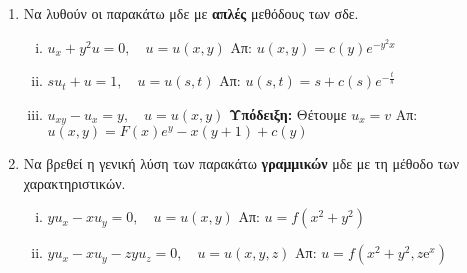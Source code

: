 \documentclass[a4paper,table]{report}
\begin{document}
\begin{center}
  \minibox{\large\bfseries \textcolor{Col1}{ΜΔΕ 1ης τάξης}}
\end{center}

\vspace{\baselineskip}

\begin{enumerate}
  \item Να λυθούν οι παρακάτω μδε με \textbf{απλές} μεθόδους των σδε.
    \begin{enumerate}[i)]
      \item $u_{x}+y^{2}u=0,\quad u=u(x,y)$ \hfill Απ: $u(x,y)=c(y)e^{-y^{2}x}$
      \item $su_{t}+u=1,\quad u=u(s,t)$ \hfill Απ: $u(s,t)=s+c(s)e^{-\frac{t}{s}}$
      \item $u_{xy}-u_{x}=y,\quad u=u(x,y)$ \quad \textcolor{Col1}{\textbf{Υπόδειξη:}} 
        Θέτουμε $ u_{x}=v $ \hfill Απ: $u(x,y)=F(x)e^{y}-x(y+1)+c(y)$ 
    \end{enumerate}

  \item Να βρεθεί η γενική λύση των παρακάτω \textbf{γραμμικών} μδε με τη μέθοδο των
    χαρακτηριστικών.

    \begin{enumerate}[i)]
      \item $yu_{x}-xu_{y}=0, \quad u=u(x,y)$ \hfill Απ: $u=f(x^{2}+y^{2})$ 
      \item $ yu_{x}-xu_{y}-zyu_{z}=0, \quad u=u(x,y,z) $ 
        \hfill Απ: $ u=f(x^{2}+y^{2}, z\mathrm{e}^{x}) $ 
    \end{enumerate}




\end{enumerate}
\end{document}
